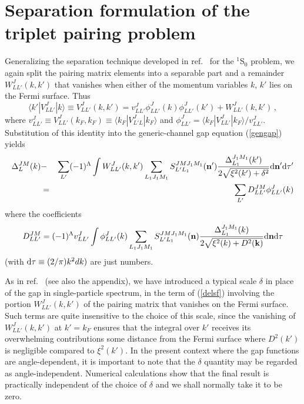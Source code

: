 \section{Separation formulation of the triplet pairing 
problem\label{sec:sepformalism}}

Generalizing the separation technique developed in ref.~\cite{kkc}
for the $^1$S$_0$ problem, we again split the pairing
matrix elements into a separable part and a remainder $ W^J_{LL'}(k,k')$
that vanishes when either of the momentum variables $k$, $k'$ lies on the
Fermi surface.  Thus
\begin{equation}
\langle k'| V_{LL'}^J| k \rangle \equiv V_{LL'}^J(k,k') =
  v_{LL'}^J\phi_{LL'}^J(k)\phi_{LL'}^J(k')
 + W_{LL'}^J(k,k') \, ,
\end{equation}
where $v_{LL'}^J \equiv V_{LL'}^J (k_F,k_F) \equiv
\langle k_F | V^J_{L'L} | k_F \rangle$ and
$\phi_{LL'}^J= \langle k_F | V_{LL'}^J | k_F \rangle  / v_{LL'}^J$.
Substitution of this identity into the generic-channel gap
equation (\ref{gengap}) yields
\begin{eqnarray}
\Delta^{JM}_L(k)&-&\sum_{L'} (-1)^\Lambda \int  W_{LL'}^J (k,k')
\sum_{L_1J_1M_1}S_{L'L_1}^{JMJ_1M_1} ({\bf n'})
{\Delta^{J_1M_1}_{L_1}(k')\over 2\sqrt{\xi^2(k')
+ \delta^2}}{\rm d}{\bf n}' {\rm d} \tau' \nonumber \\
&=&  \sum_{L'} D^{JM}_{LL'}\phi_{LL'}^J(k)
\label{delsf}
\end{eqnarray}
where the coefficients
\begin{equation}
D^{JM}_{ LL'} =  (-1)^\Lambda v_{LL'}^J\int \phi^J_{LL'}(k)
\sum_{L_1J_1M_1} S^{JMJ_1M_1}_{L'L_1}({\bf n}) \frac{\Delta^{J_1M_1}_{L_1}(k)}
{2\sqrt{\xi^2(k) + D^2({\bf k})}}{\rm d} {\bf n} {\rm d} \tau
\label{defdf}
\end{equation}
(with ${\rm d} \tau \equiv (2/\pi) k^2 dk)$ are just numbers.

As in ref.~\cite{kkc} (see also the appendix), we have introduced
a typical scale $\delta$ in place of the gap in single-particle
spectrum, in the term of (\ref{delsf}) involving the portion
$W_{LL'}^J (k,k')$ of the pairing matrix that vanishes on the
Fermi surface.  Such terms are quite insensitive to the choice of
this scale, since the vanishing of $W_{LL'}^J (k,k')$ at $k'=k_F$ 
ensures that the integral over $k'$ receives its overwhelming
contributions some distance from the Fermi surface where
$D^2(k')$ is negligible compared to $\xi^2(k')$.
In the present context where the gap functions are angle-dependent,
it is important to note that the $\delta$ quantity may be regarded
as angle-independent. Numerical calculations show that the final
result is practically independent of the choice of $\delta$
and we shall normally take it to be zero.


